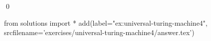 
\begin{ex} 
  \label{ex:universal-turing-machine4}
  
  \qed
\end{ex} 
\begin{python0}
from solutions import *
add(label="ex:universal-turing-machine4",
    srcfilename='exercises/universal-turing-machine4/answer.tex') 
\end{python0}
